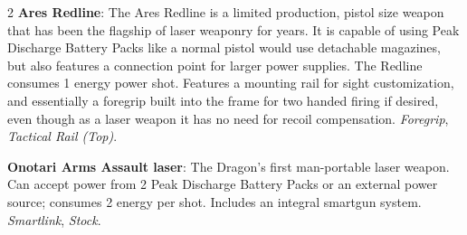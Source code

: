 \documentclass[
  oneside]{article}
\begin{document}
\begin{multicols}{2}
\textbf{Ares Redline}: The Ares Redline is a
limited production, pistol size weapon that has
been the flagship of laser weaponry for years. It
is capable of using Peak Discharge Battery Packs
like a normal pistol would use detachable
magazines, but also features a connection point
for larger power supplies. The Redline consumes 1
energy power shot. Features a mounting rail for
sight customization, and essentially a foregrip
built into the frame for two handed firing if
desired, even though as a laser weapon it has no
need for recoil compensation. \emph{Foregrip},
\emph{Tactical Rail (Top)}.

\textbf{Onotari Arms Assault laser}: The Dragon's
first man-portable laser weapon. Can accept power
from 2 Peak Discharge Battery Packs or an external
power source; consumes 2 energy per shot. Includes
an integral smartgun system. \emph{Smartlink},
\emph{Stock}.

\end{multicols}
\end{document}
